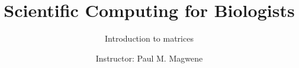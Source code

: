 \documentclass{beamer}
\title{Scientific Computing for Biologists}
\subtitle{Introduction to matrices} %
\author{Instructor: Paul M. Magwene}
\date{}
\begin{document}
\begin{frame}
\titlepage
\end{frame}

  

\end{document}
